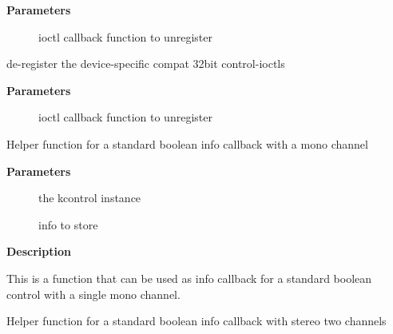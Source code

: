 \documentclass[a4paper,8pt,english]{sphinxmanual}
\begin{document}
\textbf{Parameters}
\begin{description}
\item[{}] \leavevmode
ioctl callback function to unregister

\end{description}

\begin{fulllineitems}
\label{sound/kernel-api/alsa-driver-api:c.snd_ctl_unregister_ioctl_compat}
de-register the device-specific compat 32bit control-ioctls

\end{fulllineitems}


\textbf{Parameters}
\begin{description}
\item[{}] \leavevmode
ioctl callback function to unregister

\end{description}

\begin{fulllineitems}
\label{sound/kernel-api/alsa-driver-api:c.snd_ctl_boolean_mono_info}
Helper function for a standard boolean info callback with a mono channel

\end{fulllineitems}


\textbf{Parameters}
\begin{description}
\item[{}] \leavevmode
the kcontrol instance

\item[{}] \leavevmode
info to store

\end{description}

\textbf{Description}

This is a function that can be used as info callback for a standard
boolean control with a single mono channel.

\begin{fulllineitems}
\label{sound/kernel-api/alsa-driver-api:c.snd_ctl_boolean_stereo_info}
Helper function for a standard boolean info callback with stereo two channels

\end{fulllineitems}
\end{document}
